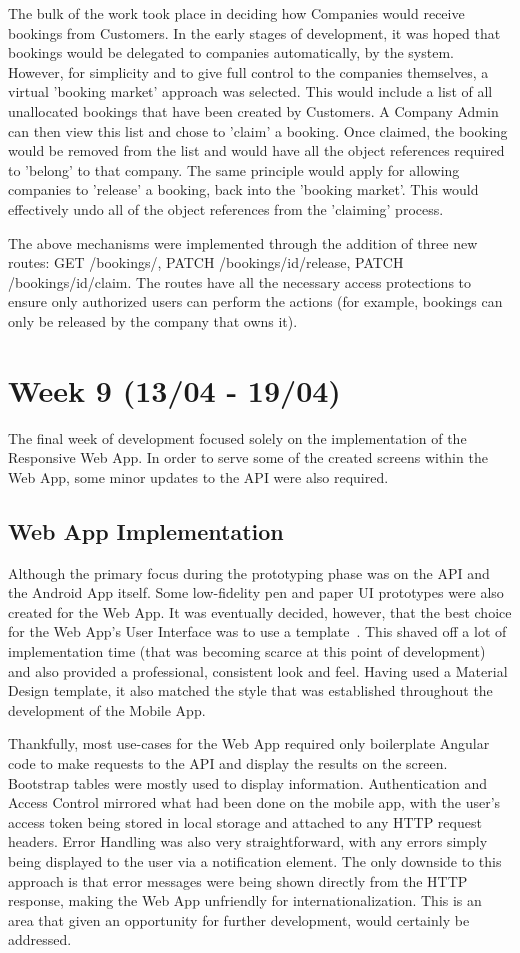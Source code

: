 The bulk of the work took place in deciding how Companies would receive bookings from Customers. In the early stages of development, it was hoped that bookings would be delegated to companies automatically, by the system. However, for simplicity and to give full control to the companies themselves, a virtual 'booking market' approach was selected. This would include a list of all unallocated bookings that have been created by Customers. A Company Admin can then view this list and chose to 'claim' a booking. Once claimed, the booking would be removed from the list and would have all the object references required to 'belong' to that company. The same principle would apply for allowing companies to 'release' a booking, back into the 'booking market'. This would effectively undo all of the object references from the 'claiming' process.

The above mechanisms were implemented through the addition of three new routes: GET /bookings/, PATCH /bookings/{id}/release, PATCH /bookings/{id}/claim. The routes have all the necessary access protections to ensure only authorized users can perform the actions (for example, bookings can only be released by the company that owns it).

\section{Week 9 (13/04 - 19/04)}
The final week of development focused solely on the implementation of the Responsive Web App. In order to serve some of the created screens within the Web App, some minor updates to the API were also required.

\subsection{Web App Implementation}
Although the primary focus during the prototyping phase was on the API and the Android App itself. Some low-fidelity pen and paper UI prototypes were also created for the Web App. It was eventually decided, however, that the best choice for the Web App's User Interface was to use a template~\cite{angular_material_documentation_ref}. This shaved off a lot of implementation time (that was becoming scarce at this point of development) and also provided a professional, consistent look and feel. Having used a Material Design template, it also matched the style that was established throughout the development of the Mobile App.

Thankfully, most use-cases for the Web App required only boilerplate Angular code to make requests to the API and display the results on the screen. Bootstrap tables were mostly used to display information. Authentication and Access Control mirrored what had been done on the mobile app, with the user's access token being stored in local storage and attached to any HTTP request headers. Error Handling was also very straightforward, with any errors simply being displayed to the user via a notification element. The only downside to this approach is that error messages were being shown directly from the HTTP response, making the Web App unfriendly for internationalization. This is an area that given an opportunity for further development, would certainly be addressed.

